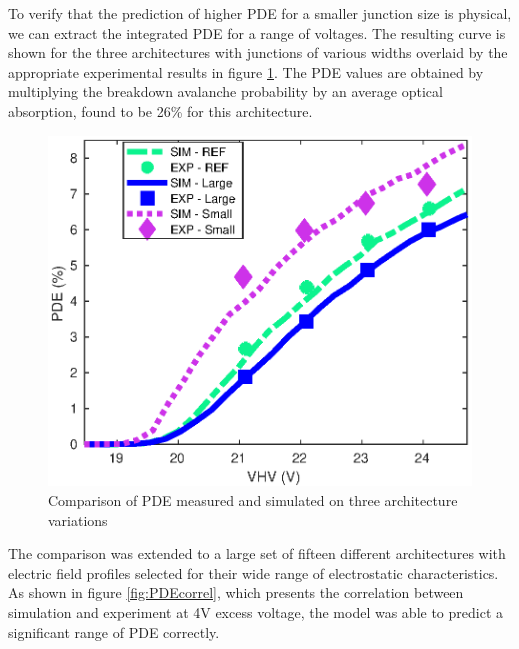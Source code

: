 \documentclass[10pt,a4paper,twocolumn]{article}
\begin{document}
To verify that the prediction of higher PDE for a smaller junction size is physical, we can extract the integrated PDE for a range of voltages. The resulting curve is shown for the three architectures with junctions of various widths overlaid by the appropriate experimental results in figure \ref{fig:PDEvsVHV}. The PDE values are obtained by multiplying the breakdown avalanche probability by an average optical absorption, found to be 26\% for this architecture.
\begin{figure}[h!]
\centering
\includegraphics[scale=0.69]{../pictures/000_McIntyre_Bench_GR5_graphs.eps}
\caption{Comparison of PDE measured and simulated on three architecture variations}
\label{fig:PDEvsVHV}
\end{figure}

The comparison was extended to a large set of fifteen different architectures with electric field profiles selected for their wide range of electrostatic characteristics. As shown in figure \ref{fig:PDEcorrel}, which presents the correlation between simulation and experiment at 4V excess voltage, the model was able to predict a significant range of PDE correctly.
\end{document}
